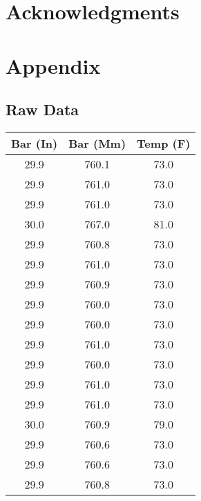 \documentclass[conf]{new-aiaa}
\begin{document}
\section{Acknowledgments}

\printbibliography

\pagebreak
\section*{Appendix}
\subsection{Raw Data}
\begin{table}[ht]
    \centering
    \footnotesize
    \begin{minipage}{0.32\textwidth}
        \centering
        \begin{tabular}{||c c c||}
            \hline
            Bar (In) & Bar (Mm) & Temp (F)  \\ [0.5ex]
            \hline\hline
             29.9 & 760.1 & 73.0 \\
             \hline
             29.9 & 761.0 & 73.0 \\
             \hline
             29.9 & 761.0 & 73.0 \\
             \hline
             30.0 & 767.0 & 81.0 \\
             \hline
             29.9 & 760.8 & 73.0 \\
             \hline
             29.9 & 761.0 & 73.0 \\
             \hline
             29.9 & 760.9 & 73.0 \\
             \hline
             29.9 & 760.0 & 73.0 \\
             \hline
             29.9 & 760.0 & 73.0 \\
             \hline
             29.9 & 761.0 & 73.0 \\
             \hline
             29.9 & 760.0 & 73.0 \\
             \hline
             29.9 & 761.0 & 73.0 \\
             \hline
             29.9 & 761.0 & 73.0 \\
             \hline
             30.0 & 760.9 & 79.0 \\
             \hline
             29.9 & 760.6 & 73.0 \\
             \hline
             29.9 & 760.6 & 73.0 \\
             \hline
             29.9 & 760.8 & 73.0 \\

\end{tabular}
\end{minipage}
\end{table}
\end{document}
